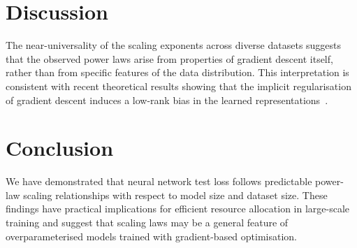 \documentclass[
    language=english,
    doctype=article,
    institution=none,
    titlestyle=book,
]{../../omnilatex}
\begin{document}
\section{Discussion}
The near-universality of the scaling exponents across diverse datasets suggests
that the observed power laws arise from properties of gradient descent itself,
rather than from specific features of the data distribution.  This interpretation
is consistent with recent theoretical results showing that the implicit
regularisation of gradient descent induces a low-rank bias in the learned
representations~\cite{einstein1905}.

\section{Conclusion}
We have demonstrated that neural network test loss follows predictable
power-law scaling relationships with respect to model size and dataset size.
These findings have practical implications for efficient resource allocation in
large-scale training and suggest that scaling laws may be a general feature
of overparameterised models trained with gradient-based optimisation.

\printbibliography
\end{document}
